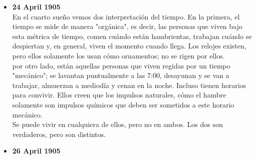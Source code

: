 \documentclass[12pt,a4paper]{report}
\begin{document}
\begin{enumerate}
{\begin{itemize}
{                Este escrito nos relata la historia de un hombre y los mundos
                que se bifurcan a partir de una decisión que toma.\\
                En el primer mundo, decide asentarse, trabajar duro, disfrutar
                momentos con sus amigos. Un día conoce a una mujer, la corteja
                a lo largo de unos meses y envejecen juntos.\\
                En el segundo mundo, decide hablar con la mujer de sus sueños.
                Su sonrisa, su risa, su elocuencia al hablar lo enamoran. Lo
                convence de cambiar de ciudad para vivir con ella y viven una
                vida apacionada. Él es feliz.\\
                En el tercer mundo, igual que en el segundo, decide hablar con
                ella, pero ella lo rechaza.\\
                Así se desarrolla la vida en este universo. Cada decisión que se
                toma se bifurca en otros mundos en los que la historia se
                desarrolla de manera diferente; y hay una infinidad de ellos.\\
            }
            \item{\textbf{24 April 1905}\\
                En el cuarto sueño vemos dos interpretación del tiempo. En la
                primera, el tiempo se mide de manera "orgánica", es decir, las
                personas que viven bajo esta métrica de tiempo, comen cuándo
                están hambrientas, trabajan cuándo se despiertan y, en general,
                viven el momento cuando llega. Los relojes existen, pero ellos
                solamente los usan cómo ornamentos; no se rigen por ellos.\\
                por otro lado, están aquellas personas que viven regidas por un
                tiempo "mecánico"; se lavantan puntualmente a las 7:00,
                desayunan y se van a trabajar, almuerzan a mediodía y cenan en
                la noche. Incluso tienen horarios para convivir. Ellos creen que
                los impulsos naturales, cómo el hambre solamente son impulsos
                químicos que deben ser sometidos a este horario mecánico.\\
                Se puede vivir en cualquiera de ellos, pero no en ambos. Los dos
                son verdaderos, pero son distintos.
            }
            \item{\textbf{26 April 1905}\\
}
\end{itemize}}
\end{enumerate}
\end{document}
